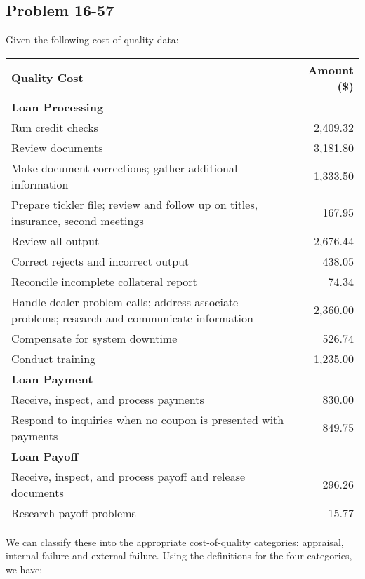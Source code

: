 \documentclass[letterpaper, 11pt]{article}
\newcommand{\1}{\mathds{1}}	%
\theoremstyle{definition}
\begin{document}
\subsection*{Problem 16-57}
Given the following cost-of-quality data:
\begin{table}[H]
\centering
\begin{tabular}{@{}p{10cm}r@{}}
\toprule
\textbf{Quality Cost} & \textbf{Amount (\$)} \\ \midrule
\multicolumn{2}{l}{\textbf{Loan Processing}} \\ \midrule
Run credit checks & 2,409.32 \\
Review documents & 3,181.80 \\
Make document corrections; gather additional information & 1,333.50 \\
Prepare tickler file; review and follow up on titles, 
insurance, second meetings & 167.95 \\
Review all output & 2,676.44 \\
Correct rejects and incorrect output & 438.05 \\
Reconcile incomplete collateral report & 74.34 \\
Handle dealer problem calls; address associate problems; 
research and communicate information & 2,360.00 \\
Compensate for system downtime & 526.74 \\
Conduct training & 1,235.00 \\ \midrule
\multicolumn{2}{l}{\textbf{Loan Payment}} \\ \midrule
Receive, inspect, and process payments & 830.00 \\
Respond to inquiries when no coupon is presented with payments & 849.75 \\ \midrule
\multicolumn{2}{l}{\textbf{Loan Payoff}} \\ \midrule
Receive, inspect, and process payoff and release documents & 296.26 \\
Research payoff problems & 15.77 \\ \bottomrule
\end{tabular}
\end{table}
\noindent We can classify these into the appropriate cost-of-quality categories: appraisal, internal failure and external failure. Using the definitions for the four categories, we have:
\end{document}
